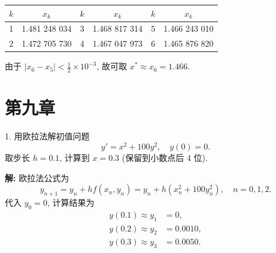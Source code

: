 \documentclass[a4paper,11pt]{ctexart}
\begin{document}
\begin{table}[h]
\centering
\begin{tabular}{c c | c c | c c}
\toprule
$k$ & $x_k$ & $k$ & $x_k$ & $k$ & $x_k$ \\
\midrule
1 & 1.481 248 034 & 3 & 1.468 817 314 & 5 & 1.466 243 010 \\
2 & 1.472 705 730 & 4 & 1.467 047 973 & 6 & 1.465 876 820 \\
\bottomrule
\end{tabular}
\end{table}

由于 $|x_6 - x_5| < \frac{1}{2} \times 10^{-3}$, 故可取 $x^* \approx x_6 = 1.466$.

\newpage

\section{第九章}

1. 用欧拉法解初值问题
\[
y' = x^2 + 100y^2, \quad y(0) = 0.
\]
取步长 $h=0.1$, 计算到 $x=0.3$ (保留到小数点后 4 位).

\textbf{解: } 欧拉法公式为
\[
y_{n+1} = y_n + h f(x_n, y_n) = y_n + h(x_n^2 + 100y_n^2), \quad n = 0, 1, 2.
\]
代入 $y_0 = 0$, 计算结果为
\begin{align*}
y(0.1) \approx y_1 &= 0, \\
y(0.2) \approx y_2 &= 0.0010, \\
y(0.3) \approx y_3 &= 0.0050.
\end{align*}
\end{document}
